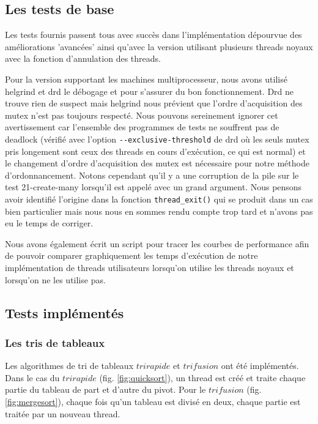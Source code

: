 \subsection{Les tests de base}

Les tests fournis passent tous avec succès dans l'implémentation dépourvue des
améliorations 'avancées' ainsi qu'avec la version utilisant plusieurs threads noyaux avec la fonction d'annulation des threads. 

Pour la version supportant les machines multiprocesseur, nous avons utilisé helgrind et drd le débogage et pour s'assurer du bon fonctionnement. Drd ne trouve rien de suspect mais helgrind nous prévient que l'ordre d'acquisition des mutex n'est pas toujours respecté. Nous pouvons sereinement ignorer cet avertissement car l'ensemble des programmes de tests ne souffrent pas de deadlock (vérifié avec l'option \verb!--exclusive-threshold! de drd où les seuls mutex pris longement sont ceux des threads en cours d'exécution, ce qui est normal) et le changement d'ordre d'acquisition des mutex est nécessaire pour notre méthode d'ordonnancement. Notons cependant qu'il y a une corruption de la pile sur le test 21-create-many lorsqu'il est appelé avec un grand argument. Nous pensons avoir identifié l'origine dans la fonction \verb!thread_exit()! qui se produit dans un cas bien particulier mais nous nous en sommes rendu compte trop tard et n'avons pas eu le temps de corriger.

Nous avons également écrit un script pour tracer les courbes de performance
afin de pouvoir comparer graphiquement les temps d'exécution de notre
implémentation de threads utilisateurs lorsqu'on utilise les threads noyaux
et lorsqu'on ne les utilise pas.

\subsection{Tests implémentés}

\subsubsection{Les tris de tableaux} Les algorithmes de tri de tableaux $tri
rapide$ et $tri fusion$ ont été implémentés. Dans le cas du $tri rapide$
(fig. \ref{fig:quicksort}), un thread est créé et traite chaque partie du
tableau de part et d'autre du pivot. Pour le $tri fusion$
(fig. \ref{fig:mergesort}), chaque fois qu'un tableau est divisé en deux,
chaque partie est traitée par un nouveau thread.\\

